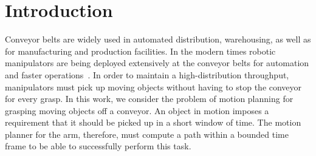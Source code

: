 \documentclass[conference]{IEEEtran}
\begin{document}
\IEEEpeerreviewmaketitle

\section{Introduction}

Conveyor belts are widely used in automated distribution, warehousing, as well as for manufacturing and production facilities. In the modern times robotic manipulators are being deployed extensively at the conveyor belts for automation and faster operations~\cite{zhang2018gilbreth}. In order to maintain a high-distribution throughput, manipulators must pick up moving objects without having to stop the conveyor for every grasp. In this work, we consider the problem of motion planning for grasping moving objects off a conveyor. An object in motion imposes a requirement that it should be picked up in a short window of time. The motion planner for the arm, therefore, must compute a path within a bounded time frame to be able to successfully perform this task.
\end{document}
